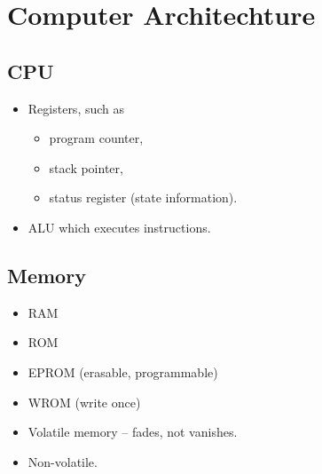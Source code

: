 \section{Computer Architechture}

%

\subsection{CPU}

\begin{frame}
  \begin{itemize}
    \item Registers, such as
      \begin{itemize}
        \item program counter,
        \item stack pointer,
        \item status register (state information).
      \end{itemize}

    \item ALU which executes instructions.
  \end{itemize}
\end{frame}

\subsection{Memory}

\begin{frame}
  \begin{itemize}
    \item RAM
    \item ROM
    \item EPROM (erasable, programmable)
    \item WROM (write once)
  \end{itemize}
\end{frame}

\begin{frame}
  \begin{itemize}
    \item Volatile memory -- fades, not vanishes.
    \item Non-volatile.
  \end{itemize}
\end{frame}


